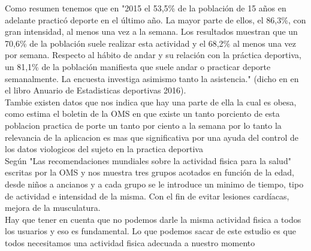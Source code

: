\documentclass[a4paper, 11pt]{article}
\begin{document}
      Como resumen tenemos que en "2015 el 53,5\% de la población de 15 años en
      adelante practicó deporte en el último año. La mayor parte de ellos, el
      86,3\%, con gran intensidad, al menos una vez a la semana. Los resultados
      muestran que un 70,6\% de la población suele realizar esta actividad y el
      68,2\% al menos una vez por semana. Respecto al hábito de andar y su
      relación con la práctica deportiva, un 81,1\% de la población manifiesta
      que suele andar o practicar deporte semanalmente. La encuesta investiga
      asimismo tanto la asistencia." (dicho en en el libro Anuario de
      Estadisticas deportivas 2016).\\

      Tambie existen datos que nos indica que hay una parte de ella la cual
      es obesa, como estima el boletin de la OMS en que existe un tanto
      porciento de esta poblacion practica de porte un tanto por ciento a la
      semana por lo tanto la relevancia de la aplicacion es mas que
      significativa por una ayuda del control de los datos viologicos del sujeto
      en la practica deportiva\\

      Según "Las recomendaciones mundiales sobre la actividad fisica para la
      salud" escritas por la OMS y nos muestra tres grupos acotados en función
      de la edad, desde niños a ancianos y a cada grupo se le introduce un
      minimo de tiempo, tipo de actividad e intensidad de la misma. Con el fin
      de evitar lesiones cardíacas, mejora de la musculatura.\\

      Hay que tener en cuenta que no podemos darle la misma actividad fisica a
      todos los usuarios y eso es fundamental. Lo que podemos sacar de este
      estudio es que todos necesitamos una actividad fisica adecuada a nuestro
      momento\\
\end{document}
